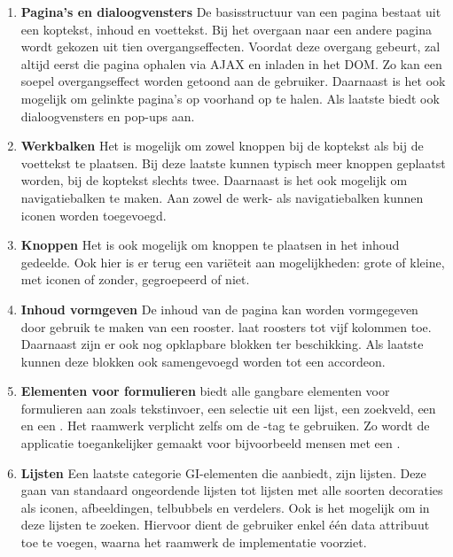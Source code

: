 \begin{enumerate}
\item \textbf{Pagina's en dialoogvensters}
De basisstructuur van een pagina bestaat uit een koptekst, inhoud en voettekst. 
Bij het overgaan naar een andere pagina wordt gekozen uit tien overgangseffecten. 
Voordat deze overgang gebeurt, zal \jqm{} altijd eerst die pagina ophalen via AJAX en inladen in het DOM. 
Zo kan een soepel overgangseffect worden getoond aan de gebruiker. 
Daarnaast is het ook mogelijk om gelinkte pagina's op voorhand op te halen. 
Als laatste biedt \jqm{} ook dialoogvensters en pop-ups aan. 

\item \textbf{Werkbalken}
Het is mogelijk om zowel knoppen bij de koptekst als bij de voettekst te plaatsen. 
Bij deze laatste kunnen typisch meer knoppen geplaatst worden, bij de koptekst slechts twee. 
Daarnaast is het ook mogelijk om navigatiebalken te maken. 
Aan zowel de werk- als navigatiebalken kunnen iconen worden toegevoegd.

\item \textbf{Knoppen}
Het is ook mogelijk om knoppen te plaatsen in het inhoud gedeelde. 
Ook hier is er terug een variëteit aan mogelijkheden: grote of kleine, met iconen of zonder, gegroepeerd of niet. 

\item \textbf{Inhoud vormgeven}
De inhoud van de pagina kan worden vormgegeven door gebruik te maken van een rooster. 
\jqm{} laat roosters tot vijf kolommen toe. 
Daarnaast zijn er ook nog opklapbare blokken ter beschikking. 
Als laatste kunnen deze blokken ook samengevoegd worden tot een accordeon. 

\item \textbf{Elementen voor formulieren}
\jqm{} biedt alle gangbare elementen voor formulieren aan zoals tekstinvoer, een selectie uit een lijst, een zoekveld, een  en een . 
Het raamwerk verplicht zelfs om de -tag te gebruiken. 
Zo wordt de applicatie toegankelijker gemaakt voor bijvoorbeeld mensen met een .

\item \textbf{Lijsten}
Een laatste categorie GI-elementen die \jqm{} aanbiedt, zijn lijsten. 
Deze gaan van standaard ongeordende lijsten tot lijsten met alle soorten decoraties als iconen, afbeeldingen, telbubbels en verdelers. 
Ook is het mogelijk om in deze lijsten te zoeken. 
Hiervoor dient de gebruiker enkel één data attribuut toe te voegen, waarna het raamwerk de implementatie voorziet. 
\end{enumerate}

